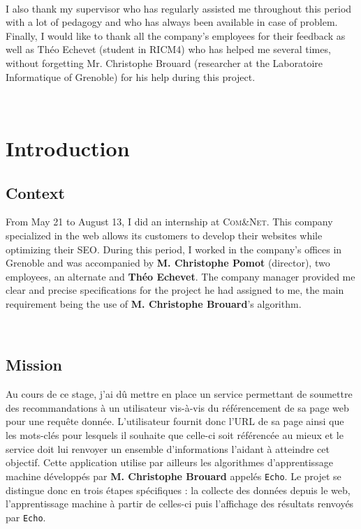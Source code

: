 \documentclass[12pt]{article}
\begin{document}
\

I also thank my supervisor who has regularly assisted me throughout this period with a lot of pedagogy and who has always been available in case of problem. Finally, I would like to thank all the company's employees for their feedback as well as Théo Echevet (student in RICM4) who has helped me several times, without forgetting Mr. Christophe Brouard (researcher at the Laboratoire Informatique of Grenoble) for his help during this project.
\

\


\newpage
\section{Introduction}

\subsection{Context}

From May 21 to August 13, I did an internship at \textsc{Com\&Net}. This company specialized in the web allows its customers to develop their websites while optimizing their SEO. During this period, I worked in the company's offices in Grenoble and was accompanied by \textbf{M. Christophe Pomot} (director), two employees, an alternate and \textbf{Théo Echevet}. The company manager provided me clear and precise specifications for the project he had assigned to me, the main requirement being the use of \textbf{M. Christophe Brouard}'s algorithm.

\

\subsection{Mission}

Au cours de ce stage, j'ai dû mettre en place un service permettant de soumettre des recommandations à un utilisateur vis-à-vis du référencement de sa page web pour une requête donnée. L'utilisateur fournit donc l'URL de sa page ainsi que les mots-clés pour lesquels il souhaite que celle-ci soit référencée au mieux et le service doit lui renvoyer un ensemble d'informations l'aidant à atteindre cet objectif. Cette application utilise par ailleurs les algorithmes d'apprentissage machine développés par \textbf{M. Christophe Brouard} appelés \texttt{Echo}. Le projet se distingue donc en trois étapes spécifiques : la collecte des données depuis le web, l'apprentissage machine à partir de celles-ci puis l'affichage des résultats renvoyés par \texttt{Echo}. 
\end{document}
